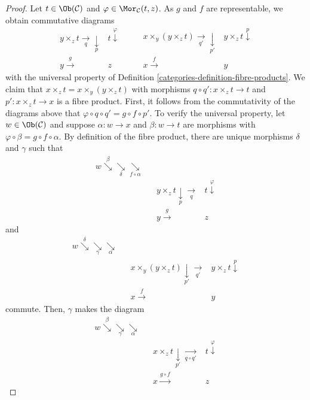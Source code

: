 \begin{proof}

Let $t \in \Ob(\mathcal C)$ and $ \varphi \in \Mor_{\mathcal C}(t,z) $.
As $g$ and $f$ are representable, we obtain commutative diagrams
$$
\begin{array}{cc}y \times_z t \underset{q}{\longrightarrow}\underset{p}{\downarrow} & t \overset{\varphi}{\downarrow} \\ y \overset{g}{\longrightarrow} & z\end{array}
\quad\quad
\begin{array}{cc}x \times_y (y\! \times_z\! t) \underset{q'}{\longrightarrow}\underset{p'}{\downarrow} & y \times_z t \overset{p}{\downarrow} \\ x \overset{f}{\longrightarrow} & y\end{array}
$$
with the universal property of Definition \ref{categories-definition-fibre-products}.
We claim that $x \times_z t = x \times_y (y \times_z t)$
with morphisms $q \circ q' : x \times_z t \to t$ and $p' : x \times_z t \to x$
is a fibre product. First, it follows from the commutativity of the
diagrams above that $\varphi \circ q \circ q' = g \circ f \circ p'$.
To verify the universal property, let
$w \in \Ob(\mathcal C)$ and suppose $\alpha : w \to x$ and
$\beta : w \to t$ are morphisms with
$\varphi \circ \beta = g \circ f \circ \alpha$.
By definition of the fibre product, there
are unique morphisms $\delta$ and $\gamma$ such that
$$
\begin{array}{cccc}w \overset{\beta}{\searrow}\underset{\delta}{\searrow}\underset{f\circ\alpha}{\searrow} &  &  &  \\  &  & y \times_z t \underset{p}{\downarrow}\underset{q}{\longrightarrow} & t \overset{\varphi}{\downarrow} \\  &  & y \overset{g}{\longrightarrow} & z\end{array}
$$
and
$$
\begin{array}{cccc}w \overset{\delta}{\searrow}\underset{\gamma}{\searrow}\underset{\alpha}{\searrow} &  &  &  \\  &  & x \times_y (y\!\times_z\! t) \underset{p'}{\downarrow}\underset{q'}{\longrightarrow} & y \times_z t \overset{p}{\downarrow} \\  &  & x \overset{f}{\longrightarrow} & y\end{array}
$$
commute. Then, $\gamma$ makes the diagram
$$
\begin{array}{cccc}w \overset{\beta}{\searrow}\underset{\gamma}{\searrow}\underset{\alpha}{\searrow} &  &  &  \\  &  & x \times_z t \underset{p'}{\downarrow}\underset{q\circ q'}{\longrightarrow} & t \overset{\varphi}{\downarrow} \\  &  & x \overset{g\circ f}{\longrightarrow} & z\end{array}
$$
\end{proof}
